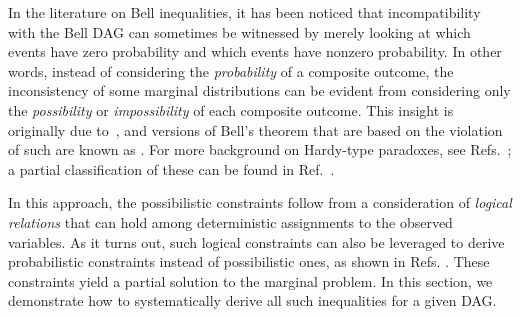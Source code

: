In the literature on Bell inequalities, it has been noticed that incompatibility with the Bell DAG can sometimes be witnessed by merely looking at which events have zero probability and which events have nonzero probability. In other words, instead of considering the \emph{probability} of a composite outcome, the inconsistency of some marginal distributions can be evident from considering only the \emph{possibility} or \emph{impossibility} of each composite outcome. This insight is originally due to~\citet{L.Hardy:PRL:1665}, and versions of Bell's theorem that are based on the violation of such  are known as . For more background on Hardy-type paradoxes, see Refs.~\cite{Garuccio95,CabelloHardyInequality,Braun08,Mancinska14,LSW}; a partial classification of these can be found in Ref.~\cite{Mansfield2012}.

In this approach, the possibilistic constraints follow from a consideration of {\em logical relations} that can hold among deterministic assignments to the observed variables.  As it turns out, such logical constraints can also be leveraged to derive probabilistic constraints instead of possibilistic ones, as shown in Refs. \cite{Pitowsky1989,Ghirardi08}.  These constraints yield a partial solution to the marginal problem.  In this section, we demonstrate how to systematically derive all such inequalities for a given DAG. 



